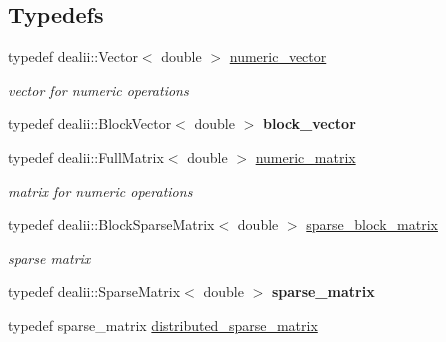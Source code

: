 \subsection*{Typedefs}
\begin{DoxyCompactItemize}
\item 
\hypertarget{namespacenatrium_a67c39077adc6634f8fa3762b8eef24c4}{
typedef dealii::Vector$<$ double $>$ \hyperlink{namespacenatrium_a67c39077adc6634f8fa3762b8eef24c4}{numeric\_\-vector}}
\label{namespacenatrium_a67c39077adc6634f8fa3762b8eef24c4}

\begin{DoxyCompactList}\small\item\em vector for numeric operations \item\end{DoxyCompactList}\item 
\hypertarget{namespacenatrium_af033b61eba66ee890834d17f01c2ecb3}{
typedef dealii::BlockVector$<$ double $>$ {\bfseries block\_\-vector}}
\label{namespacenatrium_af033b61eba66ee890834d17f01c2ecb3}

\item 
\hypertarget{namespacenatrium_ad8cbec7aab93a74837b06ded39615d47}{
typedef dealii::FullMatrix$<$ double $>$ \hyperlink{namespacenatrium_ad8cbec7aab93a74837b06ded39615d47}{numeric\_\-matrix}}
\label{namespacenatrium_ad8cbec7aab93a74837b06ded39615d47}

\begin{DoxyCompactList}\small\item\em matrix for numeric operations \item\end{DoxyCompactList}\item 
\hypertarget{namespacenatrium_acd63e25d68fdb74dd9b789bb2e836cb8}{
typedef dealii::BlockSparseMatrix$<$ double $>$ \hyperlink{namespacenatrium_acd63e25d68fdb74dd9b789bb2e836cb8}{sparse\_\-block\_\-matrix}}
\label{namespacenatrium_acd63e25d68fdb74dd9b789bb2e836cb8}

\begin{DoxyCompactList}\small\item\em sparse matrix \item\end{DoxyCompactList}\item 
\hypertarget{namespacenatrium_ab028bf9ec4c04790f1851c2351d4ae5b}{
typedef dealii::SparseMatrix$<$ double $>$ {\bfseries sparse\_\-matrix}}
\label{namespacenatrium_ab028bf9ec4c04790f1851c2351d4ae5b}

\item 
\hypertarget{namespacenatrium_a860e92befb23651241c8b3d61a0d4034}{
typedef sparse\_\-matrix \hyperlink{namespacenatrium_a860e92befb23651241c8b3d61a0d4034}{distributed\_\-sparse\_\-matrix}}
\label{namespacenatrium_a860e92befb23651241c8b3d61a0d4034}


\end{DoxyCompactItemize}
